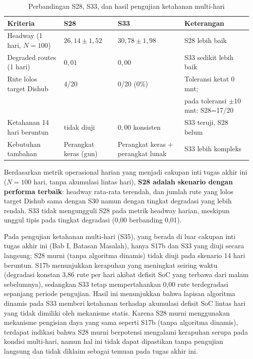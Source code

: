 \begin{table}[h]
	\centering
	\caption{Perbandingan S28, S33, dan hasil pengujian ketahanan multi-hari}
	\label{tab:rekomendasi-akhir}
	\begin{tabularx}{\linewidth}{|l|X|X|X|}
		\hline
		\textbf{Kriteria} & \textbf{S28} & \textbf{S33} & \textbf{Keterangan} \\
		\hline
		Headway (1 hari, $N=100$) & $26{,}14 \pm 1{,}52$ & $30{,}78 \pm 1{,}98$ & S28 lebih baik \\
		\hline
		Degraded routes (1 hari) & $0{,}01$ & $0{,}00$ & S33 sedikit lebih baik \\
		\hline
		Rute lolos target Dishub & 4/20 & 0/20 (0\%) & Toleransi ketat 0 mnt;\\
		& & & pada toleransi $\pm$10 mnt: S28=17/20 \\
		\hline
		Ketahanan 14 hari beruntun & tidak diuji & $0{,}00$ konsisten & S33 teruji, S28 belum \\
		\hline
		Kebutuhan tambahan & Perangkat keras (gun) & Perangkat keras + perangkat lunak & S33 lebih kompleks \\
		\hline
	\end{tabularx}
\end{table}

Berdasarkan metrik operasional harian yang menjadi cakupan inti tugas
akhir ini ($N=100$ hari, tanpa akumulasi lintas hari), \textbf{S28
	adalah skenario dengan performa terbaik}: headway rata-rata terendah,
dan jumlah rute yang lolos target Dishub sama dengan S30 namun dengan
tingkat degradasi yang lebih rendah. S33 tidak mengungguli S28 pada
metrik headway harian, meskipun unggul tipis pada tingkat degradasi
(0,00 berbanding 0,01).

Pada pengujian ketahanan multi-hari (S35), yang berada di luar cakupan
inti tugas akhir ini (Bab I, Batasan Masalah), hanya S17b dan S33 yang
diuji secara langsung; S28 murni (tanpa algoritma dinamis) tidak diuji
pada skenario 14 hari beruntun. S17b menunjukkan kerapuhan yang
meningkat seiring waktu (degradasi konstan 3,86 rute per hari akibat
defisit SoC yang terbawa dari malam sebelumnya), sedangkan S33 tetap
mempertahankan 0,00 rute terdegradasi sepanjang periode pengujian. Hasil
ini menunjukkan bahwa lapisan algoritma dinamis pada S33 memberi
ketahanan terhadap akumulasi defisit SoC lintas hari yang tidak dimiliki
oleh mekanisme statis. Karena S28 murni menggunakan mekanisme pengisian
daya yang sama seperti S17b (tanpa algoritma dinamis), terdapat indikasi
bahwa S28 murni berpotensi mengalami kerapuhan serupa pada kondisi
multi-hari, namun hal ini tidak dapat dipastikan tanpa pengujian
langsung dan tidak diklaim sebagai temuan pada tugas akhir ini.


